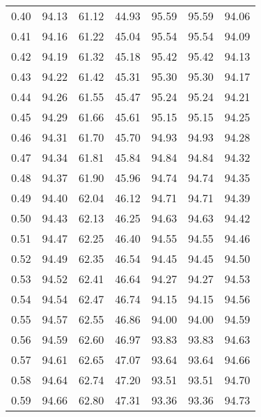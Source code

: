 \begin{tabular}{|c|c|c|c|c|c|c|}
      0.40 &     94.13 &     61.12 &      44.93 &   95.59 &      95.59 &         94.06 \\
      0.41 &     94.16 &     61.22 &      45.04 &   95.54 &      95.54 &         94.09 \\
      0.42 &     94.19 &     61.32 &      45.18 &   95.42 &      95.42 &         94.13 \\
      0.43 &     94.22 &     61.42 &      45.31 &   95.30 &      95.30 &         94.17 \\
      0.44 &     94.26 &     61.55 &      45.47 &   95.24 &      95.24 &         94.21 \\
      0.45 &     94.29 &     61.66 &      45.61 &   95.15 &      95.15 &         94.25 \\
      0.46 &     94.31 &     61.70 &      45.70 &   94.93 &      94.93 &         94.28 \\
      0.47 &     94.34 &     61.81 &      45.84 &   94.84 &      94.84 &         94.32 \\
      0.48 &     94.37 &     61.90 &      45.96 &   94.74 &      94.74 &         94.35 \\
      0.49 &     94.40 &     62.04 &      46.12 &   94.71 &      94.71 &         94.39 \\
      0.50 &     94.43 &     62.13 &      46.25 &   94.63 &      94.63 &         94.42 \\
      0.51 &     94.47 &     62.25 &      46.40 &   94.55 &      94.55 &         94.46 \\
      0.52 &     94.49 &     62.35 &      46.54 &   94.45 &      94.45 &         94.50 \\
      0.53 &     94.52 &     62.41 &      46.64 &   94.27 &      94.27 &         94.53 \\
      0.54 &     94.54 &     62.47 &      46.74 &   94.15 &      94.15 &         94.56 \\
      0.55 &     94.57 &     62.55 &      46.86 &   94.00 &      94.00 &         94.59 \\
      0.56 &     94.59 &     62.60 &      46.97 &   93.83 &      93.83 &         94.63 \\
      0.57 &     94.61 &     62.65 &      47.07 &   93.64 &      93.64 &         94.66 \\
      0.58 &     94.64 &     62.74 &      47.20 &   93.51 &      93.51 &         94.70 \\
      0.59 &     94.66 &     62.80 &      47.31 &   93.36 &      93.36 &         94.73 \\

\end{tabular}
